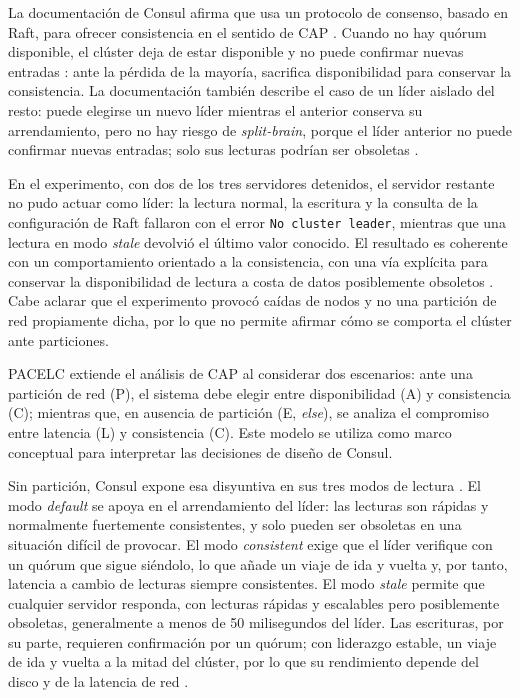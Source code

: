 \documentclass[12pt,a4paper]{article}
\begin{document}
La documentación de Consul afirma que usa un protocolo de consenso, basado en Raft, para
ofrecer consistencia en el sentido de CAP \cite{consul_consensus}. Cuando no hay quórum
disponible, el clúster deja de estar disponible y no puede confirmar nuevas entradas
\cite{consul_consensus}: ante la pérdida de la mayoría, sacrifica disponibilidad para conservar
la consistencia. La documentación también describe el caso de un líder aislado del resto: puede
elegirse un nuevo líder mientras el anterior conserva su arrendamiento, pero no hay riesgo de
\textit{split-brain}, porque el líder anterior no puede confirmar nuevas entradas; solo sus
lecturas podrían ser obsoletas \cite{consul_consensus}.

En el experimento, con dos de los tres servidores detenidos, el servidor restante no pudo
actuar como líder: la lectura normal, la escritura y la consulta de la configuración de Raft
fallaron con el error \texttt{No cluster leader}, mientras que una lectura en modo
\textit{stale} devolvió el último valor conocido. El resultado es coherente con un
comportamiento orientado a la consistencia, con una vía explícita para conservar la
disponibilidad de lectura a costa de datos posiblemente obsoletos \cite{consul_consensus}. Cabe
aclarar que el experimento provocó caídas de nodos y no una partición de red propiamente dicha,
por lo que no permite afirmar cómo se comporta el clúster ante particiones.


PACELC extiende el análisis de CAP al considerar dos escenarios: ante una partición de red (P), el sistema debe elegir entre disponibilidad (A) y consistencia (C); mientras que, en ausencia de partición (E, \textit{else}), se analiza el compromiso entre latencia (L) y consistencia (C).
Este modelo se utiliza como marco conceptual para interpretar las decisiones de diseño de Consul.


Sin partición, Consul expone esa disyuntiva en sus tres modos de lectura
\cite{consul_consensus}. El modo \textit{default} se apoya en el arrendamiento del líder: las
lecturas son rápidas y normalmente fuertemente consistentes, y solo pueden ser obsoletas en una
situación difícil de provocar. El modo \textit{consistent} exige que el líder verifique con un
quórum que sigue siéndolo, lo que añade un viaje de ida y vuelta y, por tanto, latencia a
cambio de lecturas siempre consistentes. El modo \textit{stale} permite que cualquier servidor
responda, con lecturas rápidas y escalables pero posiblemente obsoletas, generalmente a menos de
50 milisegundos del líder. Las escrituras, por su parte, requieren confirmación por un quórum;
con liderazgo estable, un viaje de ida y vuelta a la mitad del clúster, por lo que su
rendimiento depende del disco y de la latencia de red \cite{consul_consensus}.
\end{document}
